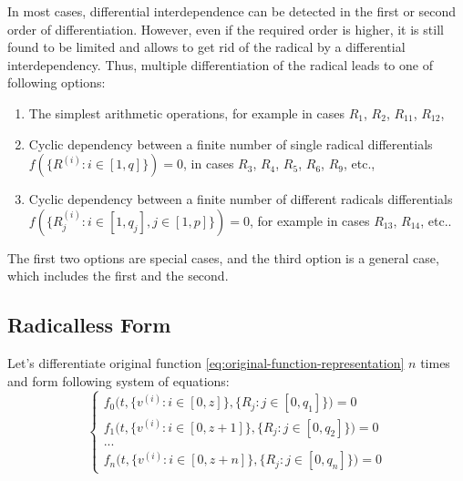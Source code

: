 \documentclass[a4paper, 11pt, oneside]{book}
\begin{document}
In most cases, differential interdependence can be detected in the first or second order of differentiation. However, even if the required order is higher, it is still found to be limited and allows to get rid of the radical by a differential interdependency. Thus, multiple differentiation of the radical leads to one of following options:

\begin{enumerate}
	\item The simplest arithmetic operations, for example in cases $R_1$, $R_2$, $R_{11}$, $R_{12}$,
  \item Cyclic dependency between a finite number of single radical differentials $f(\{R^{(i)}: i \in [1, q]\}) = 0$, in cases $R_3$, $R_4$, $R_5$, $R_6$, $R_9$, etc.,
  \item Cyclic dependency between a finite number of different radicals differentials $\displaystyle f(\{R_j^{(i)}: i \in [1, q_j], j \in [1, p]\}) = 0$, for example in cases $R_{13}$, $R_{14}$, etc..
\end{enumerate}
The first two options are special cases, and the third option is a general case, which includes the first and the second.

\subsection{Radicalless Form}
Let's differentiate original function \ref{eq:original-function-representation} $n$ times and form following system of equations:
\begin{equation}\label{eq:SE-with-radicals}
  \begin{cases}
    f_0\Big(t, \{v^{(i)}: i \in [0, z]\}, \{R_j: j \in [0, q_1]\}\Big) = 0 \\
    f_1\Big(t, \{v^{(i)}: i \in [0, z + 1]\}, \{R_j: j \in [0, q_2]\}\Big) = 0 \\
    ... \\
    f_n\Big(t, \{v^{(i)}: i \in [0, z + n]\}, \{R_j: j \in [0, q_n]\}\Big) = 0
  \end{cases}
\end{equation}
\end{document}
